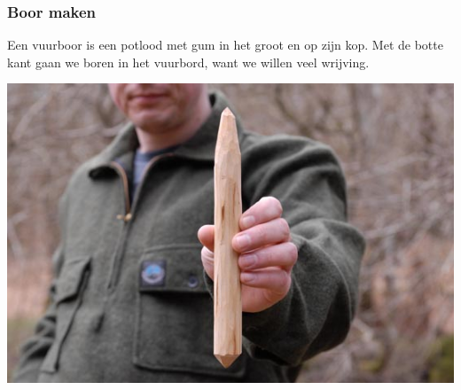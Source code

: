 \documentclass[a4paper, handout]{beamer}
\begin{document}
\begin{frame}
	\frametitle{Boor maken}
	Een vuurboor is een potlood met gum in het groot en op zijn kop. Met de botte kant gaan we boren in het vuurbord, want we willen veel wrijving.

	\includegraphics[scale=1.2]{vuurboor}
\end{frame}
\end{document}

